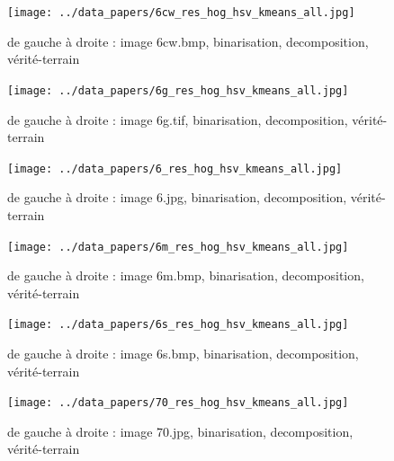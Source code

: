 \documentclass{book}
\begin{document}
\begin{figure}[H]
\begin{center}
\texttt{[image: ../data\_papers/6cw\_res\_hog\_hsv\_kmeans\_all.jpg]}
\end{center}
\caption{de gauche à droite : image 6cw.bmp, binarisation, decomposition, vérité-terrain}
\label{6cw}
\end{figure}
\clearpage


\begin{figure}[H]
\begin{center}
\texttt{[image: ../data\_papers/6g\_res\_hog\_hsv\_kmeans\_all.jpg]}
\end{center}
\caption{de gauche à droite : image 6g.tif, binarisation, decomposition, vérité-terrain}
\label{6g}
\end{figure}
\clearpage


\begin{figure}[H]
\begin{center}
\texttt{[image: ../data\_papers/6\_res\_hog\_hsv\_kmeans\_all.jpg]}
\end{center}
\caption{de gauche à droite : image 6.jpg, binarisation, decomposition, vérité-terrain}
\label{6}
\end{figure}
\clearpage


\begin{figure}[H]
\begin{center}
\texttt{[image: ../data\_papers/6m\_res\_hog\_hsv\_kmeans\_all.jpg]}
\end{center}
\caption{de gauche à droite : image 6m.bmp, binarisation, decomposition, vérité-terrain}
\label{6m}
\end{figure}
\clearpage


\begin{figure}[H]
\begin{center}
\texttt{[image: ../data\_papers/6s\_res\_hog\_hsv\_kmeans\_all.jpg]}
\end{center}
\caption{de gauche à droite : image 6s.bmp, binarisation, decomposition, vérité-terrain}
\label{6s}
\end{figure}
\clearpage


\begin{figure}[H]
\begin{center}
\texttt{[image: ../data\_papers/70\_res\_hog\_hsv\_kmeans\_all.jpg]}
\end{center}
\caption{de gauche à droite : image 70.jpg, binarisation, decomposition, vérité-terrain}
\label{70}
\end{figure}
\clearpage
\end{document}
